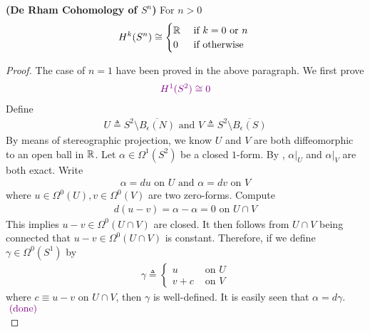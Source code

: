 \documentclass{report}
\begin{document}
\begin{theorem}
\textbf{(De Rham Cohomology of $S^n$)} For $n>0$ 
 \begin{align*}
H^k (S^n) \cong \begin{cases}
  \mathbb{R} & \text{ if $k=0\text{ or }n$ }\\
  0& \text{ if otherwise }
\end{cases}
\end{align*}
\end{theorem}
\begin{proof}
The case of $n=1$ have been proved in the above paragraph. We first prove 
\begin{align*}
\textcolor{violet}{H^1(S^2)\cong  0}
\end{align*}
Define  
 \begin{align*}
 U \triangleq S^2 \setminus \overline{B_\epsilon (N)} \text{ and }V \triangleq S^2 \setminus \overline{B_\epsilon (S)}
 \end{align*}
By means of stereographic projection, we know $U$ and  $V$ are both diffeomorphic to an open ball in  $\mathbb{R}$. Let $\alpha \in \Omega^1(S^2)$ be a closed $1$-form.  By , $\alpha |_U$ and $\alpha |_V$ are both exact. Write 
\begin{align*}
\alpha = du \text{ on }U\text{ and }\alpha =dv\text{ on }V
\end{align*}
where $u\in \Omega^{0}(U),v \in \Omega^{0}(V)$ are two zero-forms. Compute 
\begin{align*}
d(u-v)=\alpha -\alpha =0\text{ on }U\cap V
\end{align*}
This implies $u-v \in \Omega^{0}(U \cap V)$ are closed. It then follows from $U \cap V$ being connected that $u-v\in \Omega^0(U \cap V)$ is constant. Therefore, if we define $\gamma \in \Omega^0(S^1)$ by 
\begin{align*}
\gamma  \triangleq \begin{cases}
  u& \text{ on  }U\\
  v+c&\text{ on }V
\end{cases}
\end{align*}
where $c\equiv u-v$ on $U \cap V$, then $\gamma $ is well-defined. It is easily seen that $\alpha = d\gamma $. $\textcolor{violet}{\text{ (done) }}$\\


\end{proof}
\end{document}
